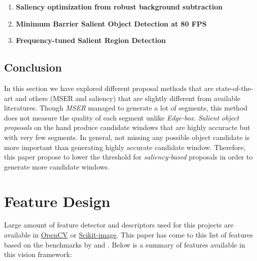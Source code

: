 \documentclass[hyp]{socreport}
\begin{document}
\begin{enumerate}
  \item \textbf{Saliency optimization from robust background subtraction} 
  \item \textbf{Minimum Barrier Salient Object Detection at 80 FPS} 
  \item \textbf{Frequency-tuned Salient Region Detection} 
\end{enumerate}

\section{Conclusion}

In this section we have explored different proposal methods that are
state-of-the-art and others (MSER and saliency) that are slightly different from
available literatures. Though \textit{MSER} managed to generate a lot of
segments, this method does not measure the quality of each segment unlike
\textit{Edge-box}. \textit{Salient object proposals} on the hand produce
candidate windows that are highly accuracte but with very few segments. In
general, not missing any possible object candidate is more important than
generating highly accurate candidate window. Therefore, this paper propose to
lower the threshold for \textit{saliency-based} proposals in order to generate
more candidate windows.


\chapter{Feature Design}

Large amount of feature detector and descriptors used for this projects are available in
\href{http://opencv.org/}{OpenCV} or
\href{http://scikit-image.org/}{Scikit-image}. This paper has come to this list
of features based on the benchmarks by  and .
Below is a summary of features available in this vision framework:
\end{document}
